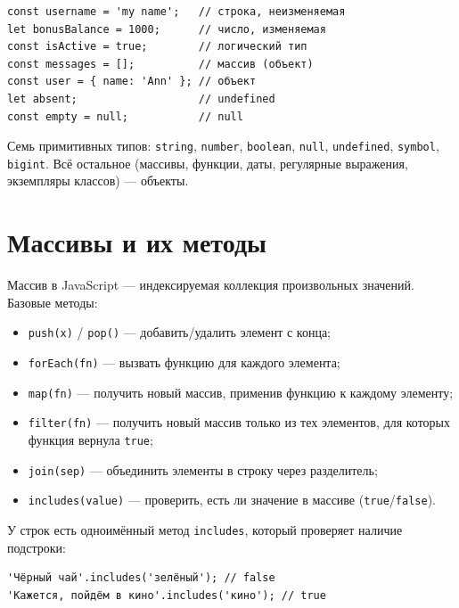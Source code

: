 \begin{lstlisting}[caption={Объявление переменных и базовые типы},captionpos=b]
const username = 'my name';   // строка, неизменяемая
let bonusBalance = 1000;      // число, изменяемая
const isActive = true;        // логический тип
const messages = [];          // массив (объект)
const user = { name: 'Ann' }; // объект
let absent;                   // undefined
const empty = null;           // null
\end{lstlisting}

Семь примитивных типов: \texttt{string}, \texttt{number},
\texttt{boolean}, \texttt{null}, \texttt{undefined}, \texttt{symbol},
\texttt{bigint}. Всё остальное (массивы, функции, даты, регулярные
выражения, экземпляры классов) --- объекты.

\section{Массивы и их методы}

Массив в JavaScript --- индексируемая коллекция произвольных значений.
Базовые методы:

\begin{itemize}
  \item \texttt{push(x)} / \texttt{pop()} --- добавить/удалить элемент с
        конца;
  \item \texttt{forEach(fn)} --- вызвать функцию для каждого элемента;
  \item \texttt{map(fn)} --- получить новый массив, применив функцию к
        каждому элементу;
  \item \texttt{filter(fn)} --- получить новый массив только из тех
        элементов, для которых функция вернула \texttt{true};
  \item \texttt{join(sep)} --- объединить элементы в строку через
        разделитель;
  \item \texttt{includes(value)} --- проверить, есть ли значение в
        массиве (\texttt{true}/\texttt{false}).
\end{itemize}

У строк есть одноимённый метод \texttt{includes}, который проверяет
наличие подстроки:

\begin{lstlisting}[caption={Поиск подстроки методом \texttt{includes}},captionpos=b]
'Чёрный чай'.includes('зелёный'); // false
'Кажется, пойдём в кино'.includes('кино'); // true
\end{lstlisting}

